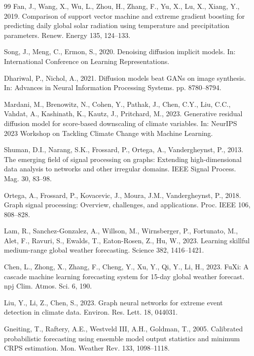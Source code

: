 \documentclass[preprint,12pt]{elsarticle}
\begin{document}
{\begin{thebibliography}{99}
Fan, J., Wang, X., Wu, L., Zhou, H., Zhang, F., Yu, X., Lu, X., Xiang, Y., 2019. Comparison of support vector machine and extreme gradient boosting for predicting daily global solar radiation using temperature and precipitation parameters. Renew. Energy 135, 124--133.

Song, J., Meng, C., Ermon, S., 2020. Denoising diffusion implicit models. In: International Conference on Learning Representations.

Dhariwal, P., Nichol, A., 2021. Diffusion models beat GANs on image synthesis. In: Advances in Neural Information Processing Systems. pp. 8780--8794.

Mardani, M., Brenowitz, N., Cohen, Y., Pathak, J., Chen, C.Y., Liu, C.C., Vahdat, A., Kashinath, K., Kautz, J., Pritchard, M., 2023. Generative residual diffusion model for score-based downscaling of climate variables. In: NeurIPS 2023 Workshop on Tackling Climate Change with Machine Learning.

Shuman, D.I., Narang, S.K., Frossard, P., Ortega, A., Vandergheynst, P., 2013. The emerging field of signal processing on graphs: Extending high-dimensional data analysis to networks and other irregular domains. IEEE Signal Process. Mag. 30, 83--98.

Ortega, A., Frossard, P., Kovacevic, J., Moura, J.M., Vandergheynst, P., 2018. Graph signal processing: Overview, challenges, and applications. Proc. IEEE 106, 808--828.

Lam, R., Sanchez-Gonzalez, A., Willson, M., Wirnsberger, P., Fortunato, M., Alet, F., Ravuri, S., Ewalds, T., Eaton-Rosen, Z., Hu, W., 2023. Learning skillful medium-range global weather forecasting. Science 382, 1416--1421.

Chen, L., Zhong, X., Zhang, F., Cheng, Y., Xu, Y., Qi, Y., Li, H., 2023. FuXi: A cascade machine learning forecasting system for 15-day global weather forecast. npj Clim. Atmos. Sci. 6, 190.

Liu, Y., Li, Z., Chen, S., 2023. Graph neural networks for extreme event detection in climate data. Environ. Res. Lett. 18, 044031.

Gneiting, T., Raftery, A.E., Westveld III, A.H., Goldman, T., 2005. Calibrated probabilistic forecasting using ensemble model output statistics and minimum CRPS estimation. Mon. Weather Rev. 133, 1098--1118.


\end{thebibliography}}
\end{document}
